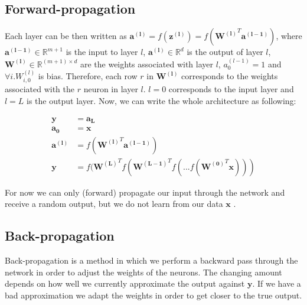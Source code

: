\subsection{Forward-propagation}

Each layer can be then written as $\boldsymbol{a^{(l)}} = f(\boldsymbol{z^{(l)}}) = f(\boldsymbol{W^{(l)}}^T \boldsymbol{a^{(l - 1)}})$, where
$\boldsymbol{a^{(l - 1)}} \in \mathbb{R}^{m + 1}$ is the input to layer $l$,
$\boldsymbol{a^{(l)}} \in \mathbb{R}^d$ is the output of layer $l$,
$\boldsymbol{W^{(l)}} \in \mathbb{R}^{(m + 1) \times d}$ are the weights associated with layer $l$, 
$a^{(l - 1)}_{0} = 1$ and
$\forall i.W^{(l)}_{i, 0}$ is bias. Therefore, each row $r$ in $\boldsymbol{W^{(l)}}$ corresponds to the weights associated with the $r$ neuron in layer $l$. $l = 0$ corresponds to the input layer and $l = L$ is the output layer. Now, we can write the whole architecture as following:

\begin{align*}
    \boldsymbol{y} &= \boldsymbol{a_{L}} \\
    \boldsymbol{a_{0}} &= \boldsymbol{x} \\
    \boldsymbol{a^{(l)}} &= f(\boldsymbol{W^{(l)}}^T \boldsymbol{a^{(l - 1)}}) \\
    \boldsymbol{y} &= f(\boldsymbol{W^{(L)}}^T f(\boldsymbol{W^{(L - 1)}}^T f(...f(\boldsymbol{W^{(0)}}^T \boldsymbol{x})))
\end{align*}

For now we can only (forward) propagate our input through the network and receive a random output, but we do not learn from our data $\boldsymbol{x}$ \cite{ml, russell2016artificial, Goodfellow-et-al-2016}.

\subsection{Back-propagation}


Back-propagation \cite{ml, russell2016artificial, Goodfellow-et-al-2016} is a method in which we perform a backward pass through the network in order to adjust the weights of the neurons. The changing amount depends on how well we currently approximate the output against $\boldsymbol{y}$. If we have a bad approximation we adapt the weights in order to get closer to the true output.

